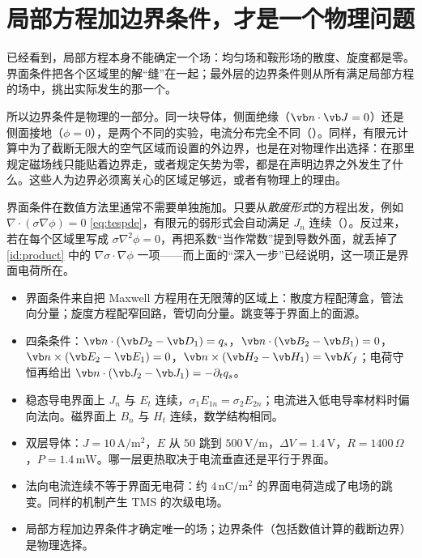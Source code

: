 \section{局部方程加边界条件，才是一个物理问题}\label{sec:interfaces-uniqueness}

 已经看到，局部方程本身不能确定一个场：均匀场和鞍形场的散度、旋度都是零。界面条件把各个区域里的解“缝”在一起；最外层的边界条件则从所有满足局部方程的场中，挑出实际发生的那一个。

所以边界条件是物理的一部分。同一块导体，侧面绝缘（$\vb n\cdot\vb J=0$）还是侧面接地（$\phi=0$），是两个不同的实验，电流分布完全不同（）。同样，有限元计算中为了截断无限大的空气区域而设置的外边界，也是在对物理作出选择：在那里规定磁场线只能贴着边界走，或者规定矢势为零，都是在声明边界之外发生了什么。这些人为边界必须离关心的区域足够远，或者有物理上的理由。

界面条件在数值方法里通常不需要单独施加。只要从\emph{散度形式}的方程出发，例如 $\nabla\cdot(\sigma\nabla\phi)=0$ \eqref{eq:tespde}，有限元的弱形式会自动满足 $J_n$ 连续（）。反过来，若在每个区域里写成 $\sigma\nabla^2\phi=0$，再把系数“当作常数”提到导数外面，就丢掉了 \eqref{id:product} 中的 $\nabla\sigma\cdot\nabla\phi$ 一项——而上面的“深入一步”已经说明，这一项正是界面电荷所在。

\begin{takeaways}
\begin{itemize}
\item 界面条件来自把 Maxwell 方程用在无限薄的区域上：散度方程配薄盒，管法向分量；旋度方程配窄回路，管切向分量。跳变等于界面上的面源。
\item 四条条件：$\vb n\cdot(\vb D_2-\vb D_1)=q_s$，$\vb n\cdot(\vb B_2-\vb B_1)=0$，$\vb n\times(\vb E_2-\vb E_1)=0$，$\vb n\times(\vb H_2-\vb H_1)=\vb K_f$；电荷守恒再给出 $\vb n\cdot(\vb J_2-\vb J_1)=-\partial_tq_s$。
\item 稳态导电界面上 $J_n$ 与 $E_t$ 连续，$\sigma_1E_{1n}=\sigma_2E_{2n}$；电流进入低电导率材料时偏向法向。磁界面上 $B_n$ 与 $H_t$ 连续，数学结构相同。
\item 双层导体：$J=10\,\mathrm{A/m^2}$，$E$ 从 $50$ 跳到 $500\,\mathrm{V/m}$，$\Delta V=1.4\,\mathrm V$，$R=1400\,\Omega$，$P=1.4\,\mathrm{mW}$。哪一层更热取决于电流垂直还是平行于界面。
\item 法向电流连续不等于界面无电荷：约 $4\,\mathrm{nC/m^2}$ 的界面电荷造成了电场的跳变。同样的机制产生 TMS 的次级电场。
\item 局部方程加边界条件才确定唯一的场；边界条件（包括数值计算的截断边界）是物理选择。
\end{itemize}
\end{takeaways}

